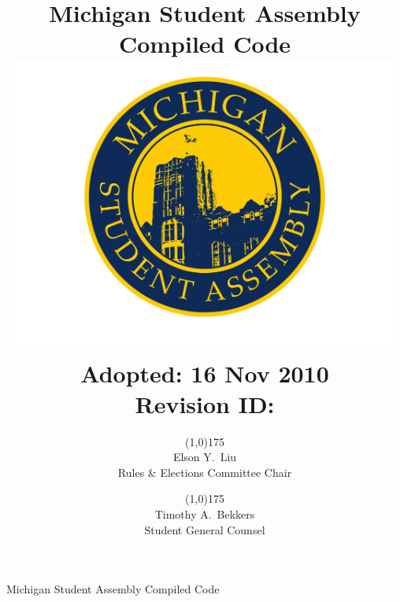 \documentclass{code}
\begin{document}
	\renewcommand{\thepage}{\roman{page}}
	\title{Michigan Student Assembly Compiled Code \\
			\large \includegraphics[width=5in]{2008_msa_color_logo} \\
			Adopted: 16 Nov 2010 \\
			Revision ID: {\tt \GITAbrHash} \\
			}
	\author{\line(1,0){175} \\
			Elson Y.~Liu \\
			Rules \& Elections Committee Chair
				\and
			\line(1,0){175} \\
			Timothy A.~Bekkers \\
			Student General Counsel}
	\date{}
	\maketitle
	\tableofcontents
	\newpage

	\renewcommand{\thepage}{\arabic{page}}
	\setcounter{page}{1}
	\pagestyle{fancy}
	\headheight 35pt
	\thispagestyle{empty}
	\linenumbers
	
	\begin{center}
			\Large Michigan Student Assembly Compiled Code
	\end{center}

	
	
	
	
	
	
	
	
	
	
	
	
	
\end{document}
